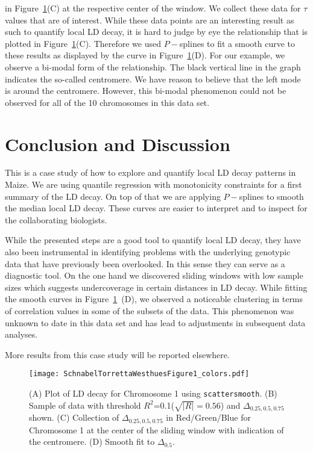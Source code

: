 \documentclass[twoside]{report}
\begin{document}
	in Figure~\ref{SchnabelTorrettaWesthues:fig1}(C) 
	at the respective center of the window. We collect these data for  
	$\tau$ values that are of interest. While these data points are an interesting result as
	such to quantify local LD decay, it is hard to judge by eye the relationship that is plotted in 
	Figure~\ref{SchnabelTorrettaWesthues:fig1}(C). 
	Therefore we used $P-$splines to fit a smooth curve to these results as 
	displayed by the curve in Figure~\ref{SchnabelTorrettaWesthues:fig1}(D). 
	For our example, we observe a bi-modal form of the 
	relationship. The black vertical line in the graph indicates the so-called centromere. 
	We have reason to believe that the left mode is around the centromere.   
	However, this bi-modal phenomenon could not be observed for 
	all of the 10 chromosomes in this data set.   

\section{Conclusion and Discussion}
This is a case study of how to explore and quantify local LD decay patterns in Maize. We are using
quantile regression with monotonicity constraints for a first summary of the LD decay. 
On top of that we are applying $P-$splines to smooth the median local LD decay. These curves 
are easier to interpret and to inspect for the collaborating biologists. 

While the presented steps are a good tool to quantify local LD decay, they have also been 
	instrumental in identifying problems with the underlying genotypic 
	data that have previously been 
	overlooked. In this sense they can serve as a diagnostic tool. 
	On the one hand we discovered sliding windows with low sample sizes which suggests 
	undercoverage in certain distances in LD decay. 
	While fitting the smooth curves in Figure~\ref{SchnabelTorrettaWesthues:fig1}~(D), we 
	observed a noticeable clustering 
	in terms of correlation values in some of the subsets of the data. This phenomenon was unknown 
	to date in this data set and has lead to adjustments in subsequent data analyses. 
	
More results from this case study will be reported elsewhere.

\begin{figure}[bt!]\centering
	\texttt{[image: SchnabelTorrettaWesthuesFigure1\_colors.pdf]}
\caption{\label{SchnabelTorrettaWesthues:fig1} (A) Plot of LD decay for Chromosome 1 
using \texttt{scattersmooth}.\newline 
(B) Sample of 
data with threshold $R^2$=0.1($\sqrt{|R|}=0.56$) and $\Delta_{0.25,0.5,0.75}$ shown. \newline
(C) Collection of $\Delta_{0.25,0.5,0.75}$ in 
Red/Green/Blue for Chromosome 1 at the center of the sliding window with indication of the centromere. 
(D) Smooth fit to $\Delta_{0.5}$.}
\end{figure}
\end{document}
